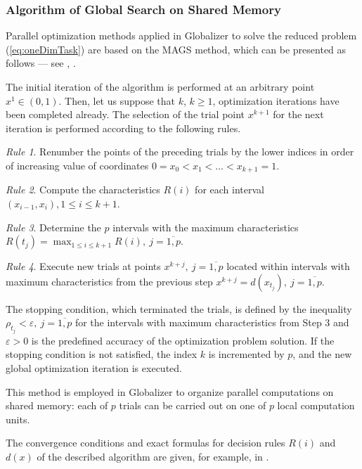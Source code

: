 \documentclass[runningheads]{llncs}
\begin{document}
\subsubsection{Algorithm of Global Search on Shared Memory}
\label{sub:ags}
Parallel optimization methods applied in Globalizer to solve the reduced problem
(\ref{eq:oneDimTask}) are based on the MAGS method, which can be presented as follows ---
see \cite{strongin1978}, \cite{strSergGO}.
\par
The initial iteration of the algorithm is performed at an arbitrary point \mbox{\(x^1\in(0,1)\)}.
Then, let us suppose that \(k\), \(k\ge 1\), optimization iterations have been completed already.
The selection of the trial point \(x^{k+1}\) for the next iteration is performed according to the
following rules.

\textit{Rule 1}. Renumber the points of the preceding trials by the lower indices in order of
increasing value of coordinates
$0=x_0<x_1<...<x_{k+1}=1$.

\textit{Rule 2}. Compute the characteristics \(R(i)\) for each interval \((x_{i-1},x_i),1\leq i\leq
k+1\).

\textit{Rule 3}. Determine the \(p\) intervals with the maximum characteristics $R(t_j)=\max_{1\leq i
\leq k+1}R(i),\: j=\overline{1,p}$.

\textit{Rule 4}. Execute new trials at points \(x^{k+j},\: j=\overline{1,p}\) located within intervals
with
maximum characteristics from the previous step
  $x^{k+j}=d(x_{t_j}),\: j=\overline{1,p}$.

The stopping condition, which terminated the trials, is defined by the inequality
$\rho_{t_j}<\varepsilon,\: j=\overline{1,p}$
for the intervals with maximum characteristics from Step 3 and \(\varepsilon >0\) is the
predefined accuracy of the optimization problem solution. If the stopping condition is not satisfied,
the index \(k\) is incremented by \(p\), and the new global optimization iteration is executed.

This method is employed in Globalizer to organize parallel computations on shared memory: each of
\(p\)
trials can be carried out on one of \(p\) local computation units.

The convergence conditions and exact formulas for decision rules $R(i)$ and $d(x)$ of the
described algorithm are given, for example, in \cite{strSergGO}.
\end{document}

